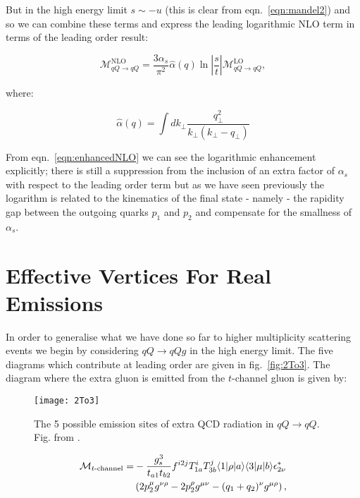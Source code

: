 		But in the high energy limit $s\sim -u$ (this is clear from eqn.~\eqref{eqn:mandel2}) and so we
		can combine these terms and express the leading logarithmic NLO term in terms of the leading order
		result:

		\begin{equation}
			\mathcal{M}_{qQ\rightarrow qQ}^{\text{NLO}} = \frac{3\alpha_s}{\pi^2}
			\hat{\alpha}(q)\ln\left|\frac{s}{t}\right|
			\mathcal{M}_{qQ\rightarrow qQ}^{\text{LO}},
			\label{eqn:enhancedNLO}
		\end{equation}

		where:

		\begin{equation}
			\hat{\alpha}(q) = \int dk_{\perp}\frac{q_{\perp}^2}{k_{\perp}(k_{\perp} - q_{\perp})}
		\end{equation}

		From eqn.~\eqref{eqn:enhancedNLO} we can see the logarithmic enhancement explicitly; there is still
		a suppression from the inclusion of an extra factor of $\alpha_s$ with respect to the leading
		order term but as we have seen previously the logarithm is related to the kinematics of the final
		state - namely - the rapidity gap between the outgoing quarks $p_1$ and $p_2$ and compensate
		for the smallness of $\alpha_s$.

	\section{Effective Vertices For Real Emissions}
		\label{sec:effectiveVertices}

		In order to generalise what we have done so far to higher multiplicity scattering events we begin
		by considering $qQ\rightarrow qQg$ in the high energy limit.  The five diagrams which contribute at
		leading order are given in fig.~\eqref{fig:2To3}.  The diagram
		where the extra gluon is emitted from the $t$-channel gluon is given by:

		\begin{figure}[hbt]
			\begin{center}
			\texttt{[image: 2To3]}
			\caption{The 5 possible emission sites of extra QCD radiation in $qQ\rightarrow qQ$.
			Fig. from \cite{Andersen:2009nu}.}
			\label{fig:2To3}
			\end{center}
		\end{figure}

		\begin{align}
		\begin{split}
			\mathcal{M}_{t\text{-channel}} = &-\frac{g_s^3}{t_{a1}t_{b2}}f^{i2j}T^i_{1a}T^j_{3b}\langle 1 | \rho | a \rangle\langle 3 | \mu | b \rangle
			\epsilon^*_{2\nu}\\&\left(2p_2^\mu g^{\nu\rho} - 2p_2^\rho g^{\mu\nu} - (q_1 + q_2)^\nu g^{\mu\rho} \right),
			\label{eqn:mtchannel}
		\end{split}
		\end{align}

